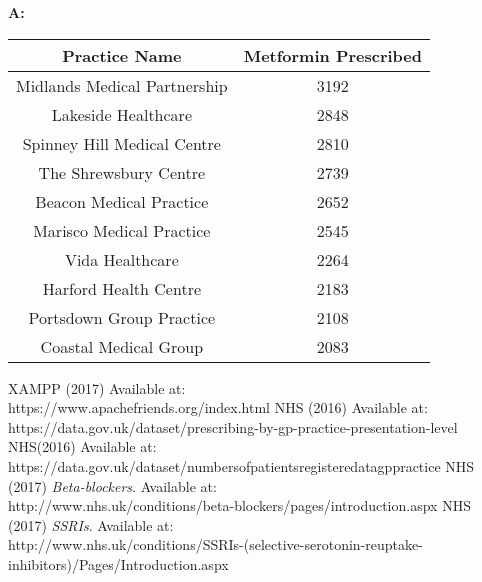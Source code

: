 \documentclass{report}
\begin{document}
\begin{center}
    \textbf{A:} 
    \begin{tabular}{ | c | c | }
    \hline
    Practice Name & Metformin Prescribed \\
    \hline
    Midlands Medical Partnership & 3192 \\
    \hline
    Lakeside Healthcare & 2848 \\
    \hline
    Spinney Hill Medical Centre & 2810 \\
    \hline
    The Shrewsbury Centre & 2739 \\
    \hline
    Beacon Medical Practice & 2652 \\
    \hline
    Marisco Medical Practice & 2545 \\
    \hline
    Vida Healthcare & 2264 \\
    \hline
    Harford Health Centre & 2183 \\
    \hline
    Portsdown Group Practice & 2108 \\
    \hline
    Coastal Medical Group & 2083 \\
    \hline
    \end{tabular}
\end{center}

\listoflistings
{}
\begin{thebibliography}{9}
		XAMPP (2017)
		Available at: \\https://www.apachefriends.org/index.html
		NHS (2016)
		Available at: \\https://data.gov.uk/dataset/prescribing-by-gp-practice-presentation-level
		NHS(2016)
		Available at: \\{https://data.gov.uk/dataset/numbers\textunderscore of\textunderscore patients\textunderscore registered\textunderscore at\textunderscore a\textunderscore gp\textunderscore practice}
		NHS (2017)
		\textit{Beta-blockers}.
		Available at: \\{http://www.nhs.uk/conditions/beta-blockers/pages/introduction.aspx}
		NHS (2017)
		\textit{SSRIs}.
		Available at: \\{http://www.nhs.uk/conditions/SSRIs-(selective-serotonin-reuptake-inhibitors)/Pages/Introduction.aspx}
\end{thebibliography}
\end{document}
